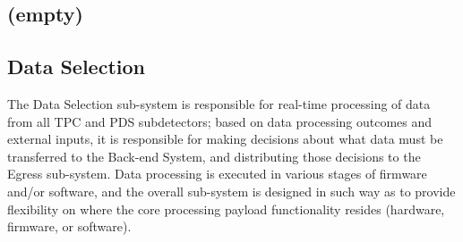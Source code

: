 





\subsection{(empty)}



\subsection{Data Selection}
\label{sec:sp-daq:design-selection-algs}

The Data Selection  sub-system is responsible for real-time processing
of data from all TPC and PDS subdetectors; based on data processing
outcomes and external inputs, it is responsible for making decisions
about what data must be transferred to the Back-end System, and
distributing those decisions to the Egress sub-system. Data processing
is executed in various stages of firmware and/or 
software, and the overall sub-system is designed in such way as to
provide flexibility on where the core processing payload functionality
resides (hardware, firmware, or software). 


